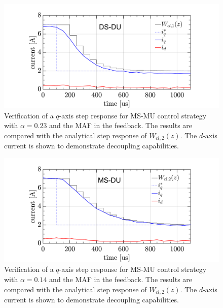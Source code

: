 \documentclass[journal]{IEEEtran}
\begin{document}
\begin{figure}[t!]
    \centerline{\includegraphics[width=1\linewidth]{figures/ivan figs/DSDUstepHIL.png}}
    \caption{Verification of a $q$-axis step response for MS-MU control strategy with $\alpha = 0.23$ and the MAF in the feedback. The results are compared with the analytical step response of $W_{cl,2}(z)$. The $d$-axis current is shown to demonstrate decoupling capabilities.}
    \label{fig:DSDU_step} 
\end{figure}
\begin{figure}[t!]
    \centerline{\includegraphics[width=1\linewidth]{figures/ivan figs/MSDUstepHIL.png}}
    \caption{Verification of a $q$-axis step response for MS-MU control strategy with $\alpha = 0.14$ and the MAF in the feedback. The results are compared with the analytical step response of $W_{cl,2}(z)$. The $d$-axis current is shown to demonstrate decoupling capabilities.}
    \label{fig:MSDU_step} 
\end{figure}
\end{document}

